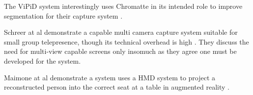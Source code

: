 The ViPiD system interestingly uses Chromatte in its intended role to improve segmentation for their capture system \cite{Klie2006}. \par
Schreer at al demonstrate a capable multi camera capture system suitable for small group telepresence, though its technical overhead is high \cite{Schreer:2008ty}. They discuss the need for multi-view capable screens only insomuch as they agree one must be developed for the system.\par
Maimone at al demonstrate a system uses a HMD system to project a reconstructed person into the correct seat at a table in augmented reality \cite{Maimone2013}.\par
                        



